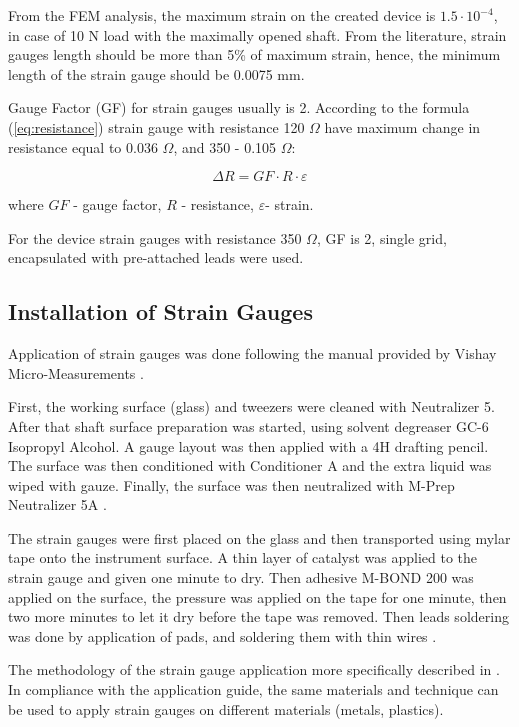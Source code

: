 From the FEM analysis, the maximum strain on the created device is $1.5 \cdot 10^{-4}$, in case of 10 N load with the maximally opened shaft. From the literature, strain gauges length should be more than 5\% of maximum strain, hence, the minimum length of the strain gauge should be 0.0075 mm. 

Gauge Factor (GF) for strain gauges usually is 2. According to the formula (\ref{eq:resistance}) strain gauge with resistance 120 $\Omega$ have maximum change in resistance equal to 0.036 $\Omega$, and 350  - 0.105 $\Omega$:

\begin{equation}\label{eq:resistance}
\Delta R=GF \cdot R \cdot \varepsilon
\end{equation}

where $GF$ - gauge factor, $R$ - resistance, $\varepsilon$- strain.

For the device strain gauges with resistance 350 $\Omega$, GF is 2, single grid, encapsulated with pre-attached leads were used.	


	\subsection{Installation of Strain Gauges}
	\label{sec:instSG}

	Application of strain gauges was done following the manual provided by Vishay Micro-Measurements \cite{StrGugeInst}.

    First, the working surface (glass) and tweezers were cleaned with Neutralizer 5. 
    After that shaft surface preparation was started, using solvent degreaser GC-6 Isopropyl Alcohol. 
    A gauge layout was then applied with a 4H drafting pencil. The surface was then conditioned with Conditioner A and the extra liquid was wiped with gauze. 
    Finally, the surface was then neutralized with M-Prep Neutralizer 5A \cite{StrGugeInst}.

    The strain gauges were first placed on the glass and then transported using mylar tape onto the instrument surface. A thin layer of catalyst was applied to the strain gauge and given one minute to dry. Then adhesive M-BOND 200 was applied on the surface, the pressure was applied on the tape for one minute, then two more minutes to let it dry before the tape was removed. Then leads soldering was done by application of pads, and soldering them with thin wires \cite{youtube}.

    The methodology of the strain gauge application more specifically described in \cite{StrGugeInst}. In compliance with the application guide, the same materials and technique can be used to apply strain gauges on different materials (metals, plastics).

